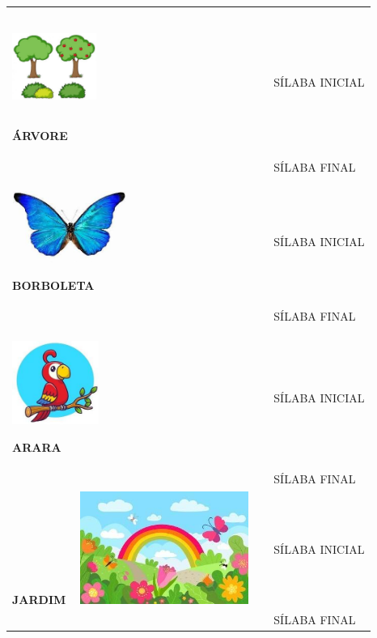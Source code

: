 \begin{longtable}[]{@{}ll@{}}
\toprule
\begin{minipage}[t]{0.48\columnwidth}\raggedright\strut
\includegraphics[width=1.08333in,height=1.19792in]{media/image110.jpg}

\textbf{ÁRVORE}\strut
\end{minipage} & \begin{minipage}[t]{0.48\columnwidth}\raggedright\strut
SÍLABA INICIAL\strut
\end{minipage}\tabularnewline
& SÍLABA FINAL\tabularnewline
\begin{minipage}[t]{0.48\columnwidth}\raggedright\strut
\includegraphics[width=1.47778in,height=0.91667in]{media/image111.jpg}

\textbf{BORBOLETA}\strut
\end{minipage} & \begin{minipage}[t]{0.48\columnwidth}\raggedright\strut
SÍLABA INICIAL\strut
\end{minipage}\tabularnewline
& SÍLABA FINAL\tabularnewline
\begin{minipage}[t]{0.48\columnwidth}\raggedright\strut
\includegraphics[width=1.11458in,height=1.08403in]{media/image112.jpg}

\textbf{ARARA}\strut
\end{minipage} & \begin{minipage}[t]{0.48\columnwidth}\raggedright\strut
SÍLABA INICIAL\strut
\end{minipage}\tabularnewline
& SÍLABA FINAL\tabularnewline
\textbf{JARDIM}\includegraphics[width=2.53125in,height=1.44792in]{media/image113.jpg}
& SÍLABA INICIAL\tabularnewline
& SÍLABA FINAL\tabularnewline
\bottomrule
\end{longtable}

